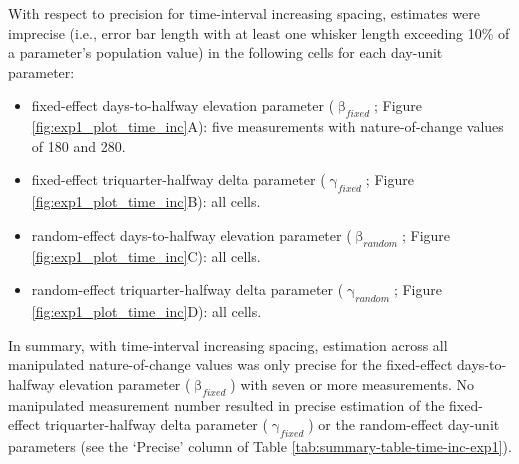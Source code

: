 \documentclass[
12pt, %
twoside,
english]{guelphthesis}
\begin{document}
With respect to precision for time-interval increasing spacing, estimates were imprecise (i.e., error bar length with at least one whisker length exceeding 10\% of a parameter's population value) in the following cells for each day-unit parameter:
\begin{itemize}
\item
  fixed-effect days-to-halfway elevation parameter (\(\upbeta_{fixed}\); Figure \ref{fig:exp1_plot_time_inc}A): five measurements with nature-of-change values of 180 and 280.
\item
  fixed-effect triquarter-halfway delta parameter (\(\upgamma_{fixed}\); Figure \ref{fig:exp1_plot_time_inc}B): all cells.
\item
  random-effect days-to-halfway elevation parameter (\(\upbeta_{random}\); Figure \ref{fig:exp1_plot_time_inc}C): all cells.
\item
  random-effect triquarter-halfway delta parameter (\(\upgamma_{random}\); Figure \ref{fig:exp1_plot_time_inc}D): all cells.
\end{itemize}
In summary, with time-interval increasing spacing, estimation across all manipulated nature-of-change values was only precise for the fixed-effect days-to-halfway elevation parameter (\(\upbeta_{fixed}\)) with seven or more measurements. No manipulated measurement number resulted in precise estimation of the fixed-effect triquarter-halfway delta parameter (\(\upgamma_{fixed}\)) or the random-effect day-unit parameters (see the `Precise' column of Table \ref{tab:summary-table-time-inc-exp1}).
\end{document}
